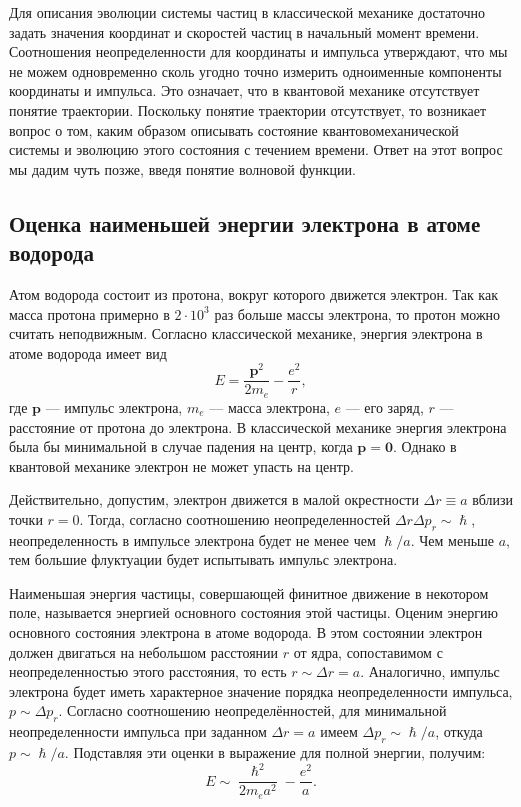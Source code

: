 \documentclass[a4paper, 12pt]{article}
\begin{document}
Для описания эволюции системы частиц в классической механике достаточно задать значения координат и скоростей частиц в начальный момент времени. Соотношения неопределенности для координаты и импульса утверждают, что мы не можем одновременно сколь угодно точно измерить одноименные компоненты координаты и импульса. Это означает, что в квантовой механике отсутствует понятие траектории. Поскольку понятие траектории отсутствует, то возникает вопрос о том, каким образом описывать состояние квантовомеханической системы и эволюцию этого состояния с течением времени. Ответ на этот вопрос мы дадим чуть позже, введя понятие волновой функции.

\subsection{Оценка наименьшей энергии электрона в атоме водорода}

Атом водорода состоит из протона, вокруг которого движется электрон. Так как
масса протона примерно в $2 \cdot 10^3$ раз больше массы электрона, то протон можно
считать неподвижным. Согласно классической механике, энергия электрона в атоме
водорода имеет вид
\begin{equation}
  E = \frac{\bm{p}^2}{2m_e} - \frac{e^2}{r},
\end{equation}
где $\bm{p}$ --- импульс электрона, $m_e$ --- масса электрона, $e$ --- его заряд,
$r$ --- расстояние от протона до электрона. В классической механике энергия
электрона была бы минимальной в случае падения на центр, когда $\bm{p} = \bm{0}$.
Однако в квантовой механике электрон не может упасть на центр.

Действительно, допустим, электрон движется в малой окрестности $\Delta{r}\equiv{a}$ вблизи
точки $r=0$. Тогда, согласно соотношению неопределенностей
$\Delta{r}\Delta{p}_r\sim\hslash$, неопределенность в импульсе электрона будет не менее чем
$\hslash/a$. Чем меньше $a$, тем большие флуктуации будет испытывать импульс
электрона.

Наименьшая энергия частицы, совершающей финитное движение в некотором поле,
называется энергией основного состояния этой частицы. Оценим энергию основного
состояния электрона в атоме водорода. В этом состоянии электрон должен двигаться
на небольшом расстоянии $r$ от ядра, сопоставимом с неопределенностью этого
расстояния, то есть $r\sim\Delta r = a$.
Аналогично, импульс электрона будет иметь характерное значение порядка
неопределенности импульса, $p \sim \Delta p_r$. Согласно соотношению неопределённостей,
для минимальной неопределенности импульса при заданном $\Delta r = a$ имеем
$\Delta p_r \sim \hslash/a$, откуда $p \sim \hslash/a$. Подставляя эти оценки в выражение для полной
энергии, получим:
\begin{equation}
  \label{eq:hydrogen-atom-energy-as-function-of-a}
  E \sim \frac{\hslash^2}{2m_ea^2} - \frac{e^2}{a}.
\end{equation}
\end{document}
